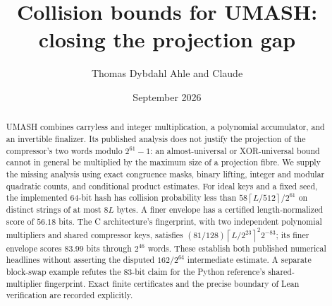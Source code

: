 \pagestyle{fancy}\fancyhf{}\fancyfoot[C]{\thepage}
\renewcommand{\headrulewidth}{0.3pt}
\newtheorem{theorem}{Theorem}[section]
\newtheorem{lemma}[theorem]{Lemma}
\newtheorem{proposition}[theorem]{Proposition}
\newtheorem{corollary}[theorem]{Corollary}
\theoremstyle{remark}\newtheorem{remark}[theorem]{Remark}
\newcommand{\F}{\mathbb F}\newcommand{\Z}{\mathbb Z}
\newcommand{\Prb}{\mathop{\rm Pr}}\newcommand{\E}{\mathbb E}
\newcommand{\xor}{\mathbin\oplus}\newcommand{\AND}{\mathbin{\&}}
\newcommand{\wt}{\operatorname{wt}}\newcommand{\val}{\nu_2}
\newcommand{\PH}{\operatorname{PH}}\newcommand{\ENH}{\operatorname{ENH}}
\newcommand{\lo}{\mathrm{lo}}\newcommand{\hi}{\mathrm{hi}}
\newcommand{\eps}{\varepsilon}\newcommand{\ceil}[1]{\left\lceil#1\right\rceil}
\newcommand{\floor}[1]{\left\lfloor#1\right\rfloor}
\setlength{\emergencystretch}{3em}
\setlength{\parskip}{2pt}
\title{Collision bounds for UMASH:\\closing the projection gap}
\author{Thomas Dybdahl Ahle and Claude}
\date{September 2026}

\maketitle
\begin{abstract}
UMASH combines carryless and integer multiplication, a polynomial accumulator, and an invertible finalizer. Its published analysis does not justify the projection of the compressor's two words modulo $2^{61}-1$: an almost-universal or XOR-universal bound cannot in general be multiplied by the maximum size of a projection fibre. We supply the missing analysis using exact congruence masks, binary lifting, integer and modular quadratic counts, and conditional product estimates. For ideal keys and a fixed seed, the implemented 64-bit hash has collision probability less than $58\ceil{L/512}/2^{61}$ on distinct strings of at most $8L$ bytes. A finer envelope has a certified length-normalized score of $56.18$ bits. The C architecture's fingerprint, with two independent polynomial multipliers and shared compressor keys, satisfies $(81/128)\ceil{L/2^{23}}^2 2^{-83}$; its finer envelope scores $83.99$ bits through $2^{46}$ words. These establish both published numerical headlines without asserting the disputed $162/2^{64}$ intermediate estimate. A separate block-swap example refutes the 83-bit claim for the Python reference's shared-multiplier fingerprint. Exact finite certificates and the precise boundary of Lean verification are recorded explicitly.
\end{abstract}


